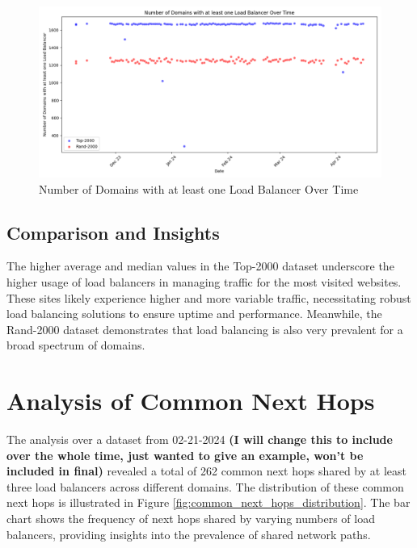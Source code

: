 \documentclass[12pt]{cwru_thesis}
\begin{document}
\begin{figure}[h]
    \centering
    \includegraphics[width=\textwidth]{figures/scatter_plot_domains.png}
    \caption{Number of Domains with at least one Load Balancer Over Time}
    \label{fig:scatter_plot_domains}
\end{figure}
\subsection{Comparison and Insights}


The higher average and median values in the Top-2000 dataset underscore the higher usage of load balancers in managing traffic for the most visited websites. These sites likely experience higher and more variable traffic, necessitating robust load balancing solutions to ensure uptime and performance. Meanwhile, the Rand-2000 dataset demonstrates that load balancing is also very prevalent for a broad spectrum of domains.





\section{Analysis of Common Next Hops}
The analysis over a dataset from 02-21-2024 \textbf{(I will change this to include over the whole time, just wanted to give an example, won't be included in final)} revealed a total of 262 common next hops shared by at least three load balancers across different domains. The distribution of these common next hops is illustrated in Figure \ref{fig:common_next_hops_distribution}. The bar chart shows the frequency of next hops shared by varying numbers of load balancers, providing insights into the prevalence of shared network paths.
\end{document}
